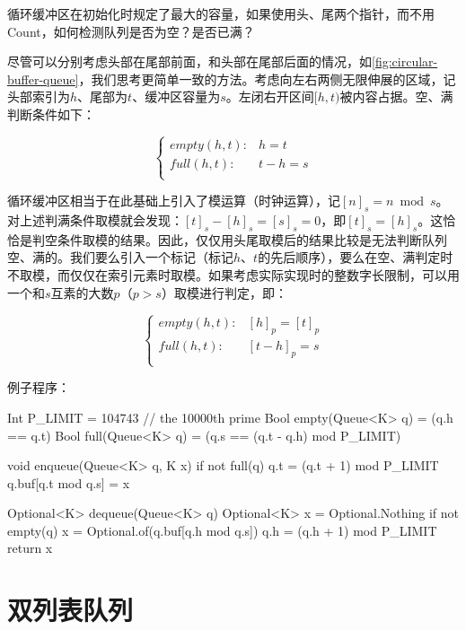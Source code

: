 \documentclass[b5paper]{ctexart}
\begin{document}
\begin{Answer}[ref = {ex:buffered-queue}]
循环缓冲区在初始化时规定了最大的容量，如果使用头、尾两个指针，而不用Count，如何检测队列是否为空？是否已满？

尽管可以分别考虑头部在尾部前面，和头部在尾部后面的情况，如\cref{fig:circular-buffer-queue}，我们思考更简单一致的方法。考虑向左右两侧无限伸展的区域，记头部索引为$h$、尾部为$t$、缓冲区容量为$s$。左闭右开区间$[h, t)$被内容占据。空、满判断条件如下：

\[
\begin{cases}
empty(h, t): & h = t  \\
full(h, t): & t - h = s \\
\end{cases}
\]

循环缓冲区相当于在此基础上引入了模运算（时钟运算），记$[n]_s = n \bmod s$。对上述判满条件取模就会发现：$[t]_s - [h]_s = [s]_s = 0$，即$[t]_s = [h]_s$。这恰恰是判空条件取模的结果。因此，仅仅用头尾取模后的结果比较是无法判断队列空、满的。我们要么引入一个标记（标记$h$、$t$的先后顺序），要么在空、满判定时不取模，而仅仅在索引元素时取模。如果考虑实际实现时的整数字长限制，可以用一个和$s$互素的大数$p$（$p > s$）取模进行判定，即：

\[
\begin{cases}
empty(h, t): & [h]_p = [t]_p  \\
full(h, t): & [t - h]_p = s \\
\end{cases}
\]

例子程序：

\begin{Bourbaki}
Int P_LIMIT = 104743 // the 10000th prime
Bool empty(Queue<K> q) = (q.h == q.t)
Bool full(Queue<K> q) = (q.s == (q.t - q.h) mod P_LIMIT)

void enqueue(Queue<K> q, K x) {
    if not full(q) {
        q.t = (q.t + 1) mod P_LIMIT
        q.buf[q.t mod q.s] = x
    }
}

Optional<K> dequeue(Queue<K> q) {
    Optional<K> x = Optional.Nothing
    if not empty(q) {
        x = Optional.of(q.buf[q.h mod q.s])
        q.h = (q.h + 1) mod P_LIMIT
    }
    return x
}
\end{Bourbaki}
\end{Answer}

\section{双列表队列}
\end{document}
